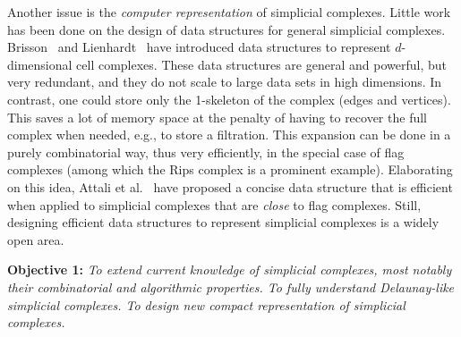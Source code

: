  
Another issue is the {\em computer representation} of simplicial complexes. 
Little work has been done on the design of data structures for general
simplicial complexes. Brisson~\cite{Brisson:1989:RGS:73833.73858} and
Lienhardt~\cite{DBLP:journals/ijcga/Lienhardt94} have introduced data
structures to represent $d$-dimensional cell complexes. These data
structures are general and powerful, but very redundant, and they do
not scale to large data sets in high dimensions.  In contrast, one
could store only the 1-skeleton of the complex (edges and vertices). This 
saves a lot of memory space at the penalty of having to recover the full complex when needed, e.g., to store a filtration. This expansion can be done in a purely combinatorial way, thus very efficiently, in the special case of flag complexes (among which the Rips complex is a prominent example). Elaborating on this idea, Attali et al.~\cite{Attali2011} have proposed a concise data structure that is efficient when applied to simplicial complexes that are {\em close} to flag complexes. Still, designing efficient data structures to represent simplicial complexes is a widely open area.


\vspace{2mm}

{\bf Objective 1:} {\em 
To extend  current knowledge of simplicial complexes, most notably their combinatorial and algorithmic properties.   To fully understand Delaunay-like simplicial complexes.  To design new  compact representation of simplicial complexes.}

